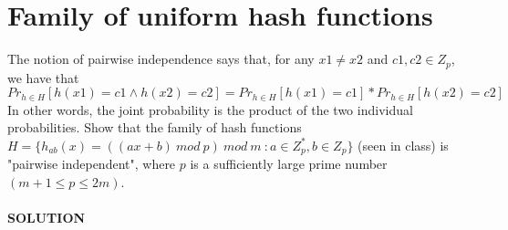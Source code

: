 \documentclass[a4paper]{article}
\begin{document}
\section*{Family of uniform hash functions}
The notion of pairwise independence says that, for any $x1 \neq x2$ and $c1, c2 \in Z_p$, we have that
\begin{equation}
Pr_{h\in H}[h(x1) = c1  \land  h(x2) = c2] = Pr_{h\in H} [h(x1) = c1] * Pr_{h\in H}[h(x2) = c2]
\nonumber
\end{equation}
In other words, the joint probability is the product of the two individual probabilities. Show that the family of hash functions $H = \{ h_{ab}(x) = ((ax + b) \ mod \ p)\ mod \ m \ : a \in Z^*_p, b \in Z_p\}$ (seen in class) is "pairwise independent", where $p$ is a sufficiently large prime number $(m + 1 \leq p \leq 2m)$.
\\
\\
\textbf{SOLUTION}
\\
\end{document}
